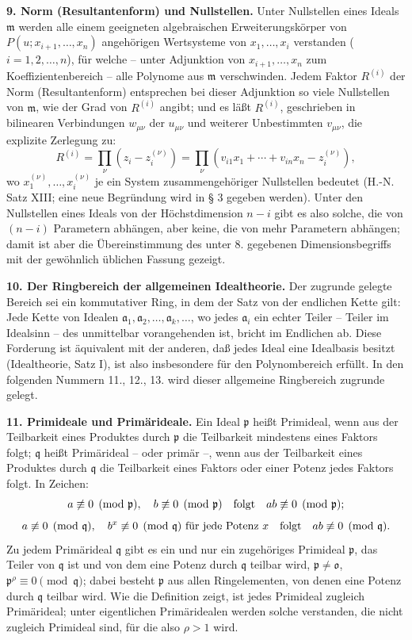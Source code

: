 \documentclass[11pt]{article}
\providecommand{\frakm}{\mathfrak m}
\providecommand{\frakp}{\mathfrak p}
\providecommand{\frakq}{\mathfrak q}
\providecommand{\fraka}{\mathfrak a}
\providecommand{\frako}{\mathfrak o}
\begin{document}
\textbf{9. Norm (Resultantenform) und Nullstellen.} Unter Nullstellen eines Ideals $\frakm$ werden alle einem geeigneten algebraischen Erweiterungskörper von $P(u;x_{i+1},\ldots,x_n)$ angehörigen Wertsysteme von $x_1,\ldots,x_i$ verstanden ($i=1,2,\ldots,n$), für welche -- unter Adjunktion von $x_{i+1},\ldots,x_n$ zum Koeffizientenbereich -- alle Polynome aus $\frakm$ verschwinden. Jedem Faktor $R^{(i)}$ der Norm (Resultantenform) entsprechen bei dieser Adjunktion so viele Nullstellen von $\frakm$, wie der Grad von $R^{(i)}$ angibt; und es läßt $R^{(i)}$, geschrieben in bilinearen Verbindungen $w_{\mu\nu}$ der $u_{\mu\nu}$ und weiterer Unbestimmten $v_{\mu\nu}$, die explizite Zerlegung zu:
\begin{equation}
 R^{(i)}=\prod_\nu (z_i-z_i^{(\nu)})
 =\prod_\nu (v_{i1}x_1+\cdots+v_{in}x_n - z_i^{(\nu)}), \tag{5}
\end{equation}
wo $x_1^{(\nu)},\ldots,x_i^{(\nu)}$ je ein System zusammengehöriger Nullstellen bedeutet (H.-N. Satz XIII; eine neue Begründung wird in § 3 gegeben werden). Unter den Nullstellen eines Ideals von der Höchstdimension $n-i$ gibt es also solche, die von $(n-i)$ Parametern abhängen, aber keine, die von mehr Parametern abhängen; damit ist aber die Übereinstimmung des unter 8. gegebenen Dimensionsbegriffs mit der gewöhnlich üblichen Fassung gezeigt.

\textbf{10. Der Ringbereich der allgemeinen Idealtheorie.} Der zugrunde gelegte Bereich sei ein kommutativer Ring, in dem der Satz von der endlichen Kette gilt: Jede Kette von Idealen $\fraka_1,\fraka_2,\ldots,\fraka_k,\ldots$, wo jedes $\fraka_i$ ein echter Teiler -- Teiler im Idealsinn -- des unmittelbar vorangehenden ist, bricht im Endlichen ab. Diese Forderung ist äquivalent mit der anderen, daß jedes Ideal eine Idealbasis besitzt (Idealtheorie, Satz I), ist also insbesondere für den Polynombereich erfüllt. In den folgenden Nummern 11., 12., 13. wird dieser allgemeine Ringbereich zugrunde gelegt.

\textbf{11. Primideale und Primärideale.} Ein Ideal $\frakp$ heißt Primideal, wenn aus der Teilbarkeit eines Produktes durch $\frakp$ die Teilbarkeit mindestens eines Faktors folgt; $\frakq$ heißt Primärideal -- oder primär --, wenn aus der Teilbarkeit eines Produktes durch $\frakq$ die Teilbarkeit eines Faktors oder einer Potenz jedes Faktors folgt. In Zeichen:
\[
 a\not\equiv0\pmod{\frakp},\quad b\not\equiv0\pmod{\frakp}\quad\hbox{folgt}\quad ab\not\equiv0\pmod{\frakp};
\]
\[
 a\not\equiv0\pmod{\frakq},\quad b^x\not\equiv0\pmod{\frakq}\ \hbox{für jede Potenz }x\quad\hbox{folgt}\quad ab\not\equiv0\pmod{\frakq}.
\]
Zu jedem Primärideal $\frakq$ gibt es ein und nur ein zugehöriges Primideal $\frakp$, das Teiler von $\frakq$ ist und von dem eine Potenz durch $\frakq$ teilbar wird, $\frakp\ne\frako$, $\frakp^\rho\equiv0\pmod{\frakq}$; dabei besteht $\frakp$ aus allen Ringelementen, von denen eine Potenz durch $\frakq$ teilbar wird. Wie die Definition zeigt, ist jedes Primideal zugleich Primärideal; unter eigentlichen Primäridealen werden solche verstanden, die nicht zugleich Primideal sind, für die also $\rho>1$ wird.
\end{document}
